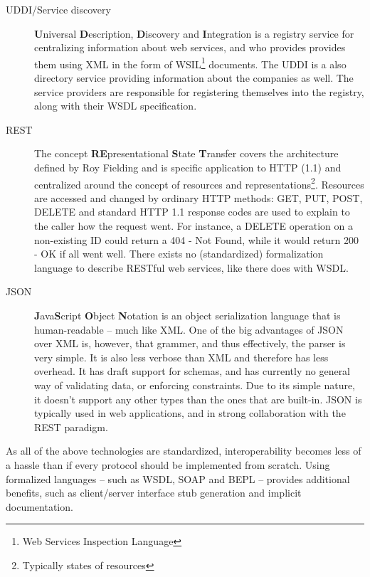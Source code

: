 \begin{description}
\item[UDDI/Service discovery] \textbf{U}niversal \textbf{D}escription, \textbf{D}iscovery and \textbf{I}ntegration is a registry service for centralizing information about web services, and who provides provides them using XML in the form of WSIL\footnote{Web Services Inspection Language} documents. The UDDI is a also directory service providing information about the companies as well. The service providers are responsible for registering themselves into the registry, along with their WSDL specification.

\item[REST] The concept \textbf{RE}presentational \textbf{S}tate \textbf{T}ransfer covers the architecture defined by Roy Fielding and is specific application to HTTP (1.1) and centralized around the concept of resources and representations\footnote{Typically states of resources}. Resources are accessed and changed by ordinary HTTP methods: GET, PUT, POST, DELETE and standard HTTP 1.1 response codes are used to explain to the caller how the request went. For instance, a DELETE operation on a non-existing ID could return a 404 - Not Found, while it would return 200 - OK if all went well. There exists no (standardized) formalization language to describe RESTful web services, like there does with WSDL.

\item[JSON] \textbf{J}ava\textbf{S}cript \textbf{O}bject \textbf{N}otation is an object serialization language that is human-readable -- much like XML. One of the big advantages of JSON over XML is, however, that grammer, and thus effectively, the parser is very simple. It is also less verbose than XML and therefore has less overhead. It has draft support for schemas, and has currently no general way of validating data, or enforcing constraints. Due to its simple nature, it doesn't support any other types than the ones that are built-in. JSON is typically used in web applications, and in strong collaboration with the REST paradigm.


\end{description}As all of the above technologies are standardized, interoperability becomes less of a hassle than if every protocol should be implemented from scratch. Using formalized languages -- such as WSDL, SOAP and BEPL -- provides additional benefits, such as client/server interface stub generation and implicit documentation.